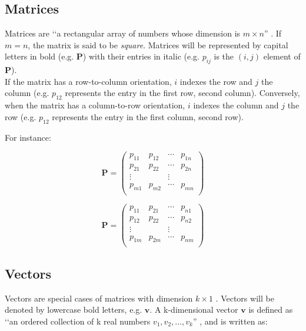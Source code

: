 \documentclass[\main/main.tex]{subfiles}
\begin{document}
\subsection{Matrices}
Matrices are \lq\lq a rectangular array of numbers whose dimension is $m \times n$'' \citep{Bradley1977}. If $m = n$, the matrix is said to be \textit{square}. 
Matrices will be represented by capital letters in bold (e.g. $\mathbf{P}$) with their entries in italic (e.g. $p_{ij}$ is the $(i,j)$ element of $\mathbf{P}$).\\
If the matrix has a row-to-column orientation, $i$ indexes the row and $j$ the column (e.g. $p_{12}$ represents the entry in the first row, second column). Conversely, when the matrix has a column-to-row orientation, $i$ indexes the column and $j$ the row (e.g. $p_{12}$ represents the entry in the first column, second row).

\noindent For instance:\\
\begin{center}
\begin{minipage}{.4\linewidth}
\begin{equation*}
\mathbf{P} =
\begin{pmatrix}
p_{11} & p_{12} & \cdots & p_{1n}\\
p_{21} & p_{22} & \cdots & p_{2n}\\
\vdots & & \vdots\\
p_{m1} & p_{m2} & \cdots & p_{mn}\\
\end{pmatrix}
\end{equation*}
\end{minipage}%
\begin{minipage}{.4\linewidth}
\begin{equation*}
\mathbf{P} =
\begin{pmatrix}
p_{11} & p_{21} & \cdots & p_{n1}\\
p_{12} & p_{22} & \cdots & p_{n2}\\
\vdots & & \vdots\\
p_{1m} & p_{2m} & \cdots & p_{nm}\\
\end{pmatrix}
\end{equation*}
\end{minipage}
   
\end{center}


\subsection{Vectors}
Vectors are special cases of matrices with dimension $k \times 1$ . Vectors will be denoted by lowercase bold letters, e.g. $\mathbf{v}$.
A k-dimensional vector $\mathbf{v}$ is defined as \lq\lq an ordered collection of k real numbers $v_1, v_2, . . . , v_k$'' \citep{Bradley1977}, and is written as:
\end{document}
